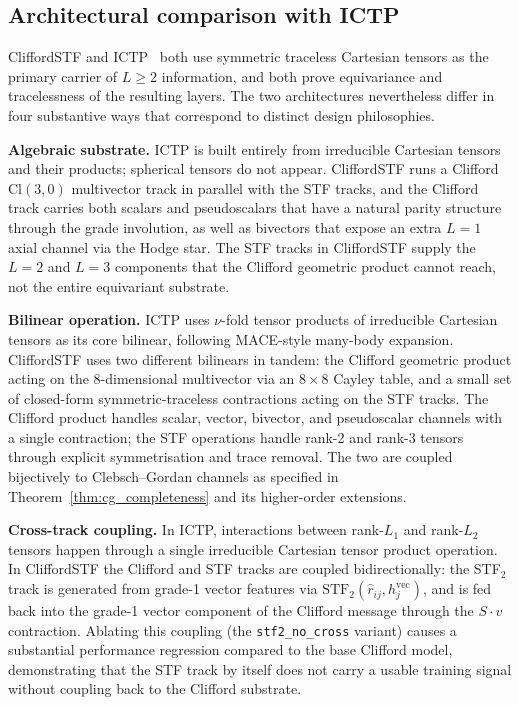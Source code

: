 \subsection{Architectural comparison with ICTP}\label{supp:ictp}

CliffordSTF and ICTP~\citep{zaverkin2024ictp} both use symmetric traceless Cartesian tensors as the primary carrier of $L \geq 2$ information, and both prove equivariance and tracelessness of the resulting layers. The two architectures nevertheless differ in four substantive ways that correspond to distinct design philosophies.

\textbf{Algebraic substrate.} ICTP is built entirely from irreducible Cartesian tensors and their products; spherical tensors do not appear. CliffordSTF runs a Clifford $\mathrm{Cl}(3,0)$ multivector track in parallel with the STF tracks, and the Clifford track carries both scalars and pseudoscalars that have a natural parity structure through the grade involution, as well as bivectors that expose an extra $L{=}1$ axial channel via the Hodge star. The STF tracks in CliffordSTF supply the $L{=}2$ and $L{=}3$ components that the Clifford geometric product cannot reach, not the entire equivariant substrate.

\textbf{Bilinear operation.} ICTP uses $\nu$-fold tensor products of irreducible Cartesian tensors as its core bilinear, following MACE-style many-body expansion. CliffordSTF uses two different bilinears in tandem: the Clifford geometric product acting on the 8-dimensional multivector via an $8 \times 8$ Cayley table, and a small set of closed-form symmetric-traceless contractions acting on the STF tracks. The Clifford product handles scalar, vector, bivector, and pseudoscalar channels with a single contraction; the STF operations handle rank-2 and rank-3 tensors through explicit symmetrisation and trace removal. The two are coupled bijectively to Clebsch--Gordan channels as specified in Theorem~\ref{thm:cg_completeness} and its higher-order extensions.

\textbf{Cross-track coupling.} In ICTP, interactions between rank-$L_1$ and rank-$L_2$ tensors happen through a single irreducible Cartesian tensor product operation. In CliffordSTF the Clifford and STF tracks are coupled bidirectionally: the STF$_2$ track is generated from grade-1 vector features via $\mathrm{STF}_2(\hat{r}_{ij}, h_j^{\mathrm{vec}})$, and is fed back into the grade-1 vector component of the Clifford message through the $S \cdot v$ contraction. Ablating this coupling (the \texttt{stf2\_no\_cross} variant) causes a substantial performance regression compared to the base Clifford model, demonstrating that the STF track by itself does not carry a usable training signal without coupling back to the Clifford substrate.

